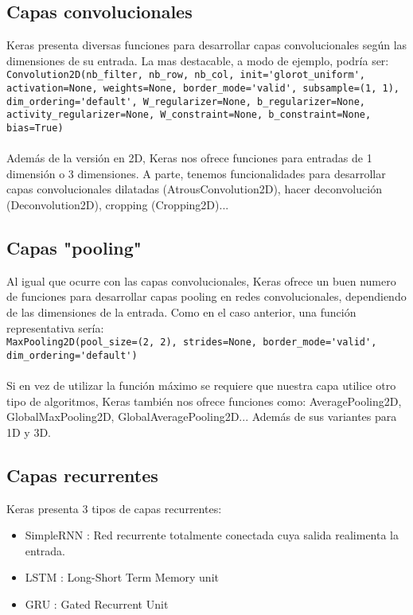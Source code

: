 \subsection{Capas convolucionales}
Keras presenta diversas funciones para desarrollar capas convolucionales según las dimensiones de su entrada. La mas destacable, a modo de ejemplo, podría ser:\\
\lstinline{Convolution2D(nb_filter, nb_row, nb_col, init='glorot_uniform', activation=None, weights=None, border_mode='valid', subsample=(1, 1), dim_ordering='default', W_regularizer=None, b_regularizer=None, activity_regularizer=None, W_constraint=None, b_constraint=None, bias=True)}\\\\
Además de la versión en 2D, Keras nos ofrece funciones para entradas de 1 dimensión o 3 dimensiones. A parte, tenemos funcionalidades para desarrollar capas convolucionales dilatadas (AtrousConvolution2D), hacer deconvolución (Deconvolution2D), cropping (Cropping2D)...
\subsection{Capas "pooling"}
Al igual que ocurre con las capas convolucionales, Keras ofrece un buen numero de funciones para desarrollar capas pooling en redes convolucionales, dependiendo de las dimensiones de la entrada. Como en el caso anterior, una función representativa sería:\\
\lstinline{MaxPooling2D(pool_size=(2, 2), strides=None, border_mode='valid', dim_ordering='default')}\\\\
Si en vez de utilizar la función máximo se requiere que nuestra capa utilice otro tipo de algoritmos, Keras también nos ofrece funciones como: AveragePooling2D, GlobalMaxPooling2D, GlobalAveragePooling2D... Además de sus variantes para 1D y 3D.
\subsection{Capas recurrentes}
Keras presenta 3 tipos de capas recurrentes:
\begin{itemize}[noitemsep]
\item SimpleRNN : Red recurrente totalmente conectada cuya salida realimenta la entrada.
\item LSTM : Long-Short Term Memory unit
\item GRU : Gated Recurrent Unit
\end{itemize}

